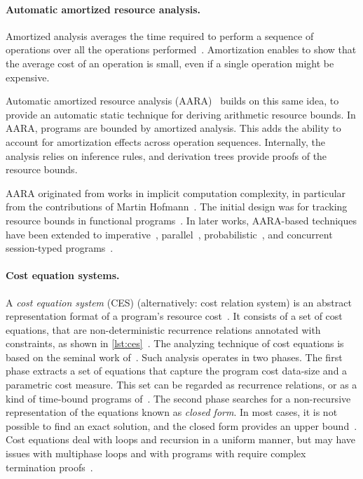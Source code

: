 \paragraph*{Automatic amortized resource analysis.}
Amortized analysis averages the time required to perform a
sequence of operations over all the operations performed~\cite[p.
451]{cormen2009}. Amortization enables to show that the average cost of an
operation is small, even if a single operation might be expensive.

Automatic amortized resource analysis (AARA)~\cite{hoffmann2022} builds on this
same idea, to provide an automatic static technique for deriving arithmetic
resource bounds. In AARA, programs are bounded by amortized
analysis. This adds the ability to account for amortization
effects across operation sequences. Internally, the analysis relies on inference
rules, and derivation trees provide proofs of the resource bounds.

AARA originated from works in implicit computation complexity, in particular
from the contributions of Martin Hofmann~\cite{hoffmann2022}. The initial design
was for tracking resource bounds in functional programs~\cite{hoffmann2012}. In
later works, AARA-based techniques have been extended to
imperative~\cite{carbonneaux2015,carbonneaux2017}, parallel~\cite{hoffmann2015},
probabilistic~\cite{avanzini2020,ngo2018,wang2020}, and concurrent session-typed
programs~\cite{das2018,das2021}.

\paragraph*{Cost equation systems.}
A \emph{cost equation system} (CES) (alternatively: cost relation system) is an abstract representation format of a program's resource cost~\cite{floresmontoya2017,albert2019}.
It consists of a set of cost equations, that are non-deterministic recurrence relations annotated with constraints, as shown in \autoref{lst:ces}~\cite{floresmontoya2014}.
The analyzing technique of cost equations is based on the seminal work of~\textcite{wegbreit1975}.
Such analysis operates in two phases.
The first phase extracts a set of equations that capture the program cost \wrt data-size and a parametric cost measure.
This set can be regarded as recurrence relations, or as a kind of time-bound programs of~\textcite{rosendahl1989}.
The second phase searches for a non-recursive representation of the equations known as \emph{closed form}.
In most cases, it is not possible to find an exact solution, and the closed form provides an upper bound~\cite{albert2008}.
Cost equations deal with loops and recursion in a uniform manner,
but may have issues with multiphase loops and with programs with require complex termination proofs~\cite{floresmontoya2014}.

